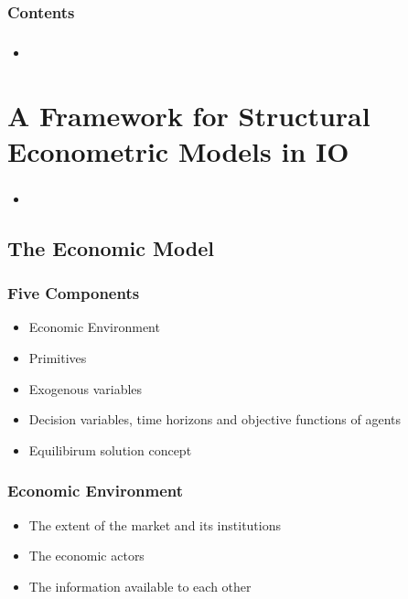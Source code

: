 \documentclass{beamer}
\title{}
\subtitle{}
\author{Guo Zhang}
\institute{WISE, Xiamen University}
\date{This Version: \today}
\begin{document}
\begin{frame}
\maketitle
\end{frame}

\begin{frame}[plain]
\frametitle{Contents}
\tableofcontents[hideallsubsections]
\end{frame}

\begin{frame}
\frametitle{}
\begin{itemize}
\item 
\end{itemize}
\end{frame}


\section{A Framework for Structural Econometric Models in IO}
\begin{frame}
\frametitle{}
\begin{itemize}
\item 
\end{itemize}
\end{frame}

\subsection{The Economic Model}
\begin{frame}
\frametitle{Five Components}
\begin{itemize}
\item Economic Environment
\item Primitives
\item Exogenous variables
\item Decision variables, time horizons and objective functions of agents 
\item Equilibirum solution concept
\end{itemize}
\end{frame}

\begin{frame}
\frametitle{Economic Environment}
\begin{itemize}
\item The extent of the market and its institutions
\item The economic actors
\item The information available to each other
\end{itemize}
\end{frame}
\end{document}
